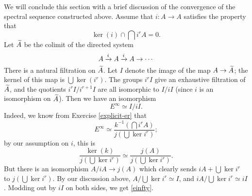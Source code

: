 We will conclude this section with a brief discussion of the convergence of the
spectral sequence constructed above.  Assume that $i:A\to A$ satisfies the
property that
$$\ker(i)\cap\bigcap i^r A = 0.$$
Let $\widetilde{{A}}$ be the colimit of the directed system
$$A\xrightarrow{{i}} A\xrightarrow{{i}} A\to\cdots$$
There is a natural filtration on $\widetilde{{A}}$. Let $I$ denote the image of the map
$A\to \widetilde{{A}}$; the kernel of this map is $\bigcup \ker(i^r)$. The groups $i^r
I$ give an exhaustive filtration of $\widetilde{{A}}$, and the quotients $i^r I/i^{r+1}
I$ are all isomorphic to $I/i I$ (since $i$ is an isomorphism on $\widetilde{{A}}$).
Then we have an isomorphism
\begin{equation}\label{einfty}
    E^\infty \simeq I/iI.
\end{equation}
Indeed, we know from Exercise \ref{explicit-er} that
$$E^\infty \simeq \frac{k^{-1}\left(\bigcap i^r A\right)}{j\left(\bigcup \ker
i^{r}\right)};$$
by our assumption on $i$, this is
$$\frac{\ker(k)}{j\left(\bigcup \ker i^{r}\right)} \simeq
\frac{j(A)}{j\left(\bigcup \ker i^r\right)}.$$
But there is an isomorphism $A/iA\to j(A)$ which clearly sends $iA + \bigcup
\ker i^r$ to $j\left(\bigcup \ker i^r\right)$. By our discussion above,
$A/\bigcup \ker i^r \simeq I$, and $iA/\bigcup \ker i^r \simeq iI$. Modding out
by $iI$ on both sides, we get \eqref{einfty}.

